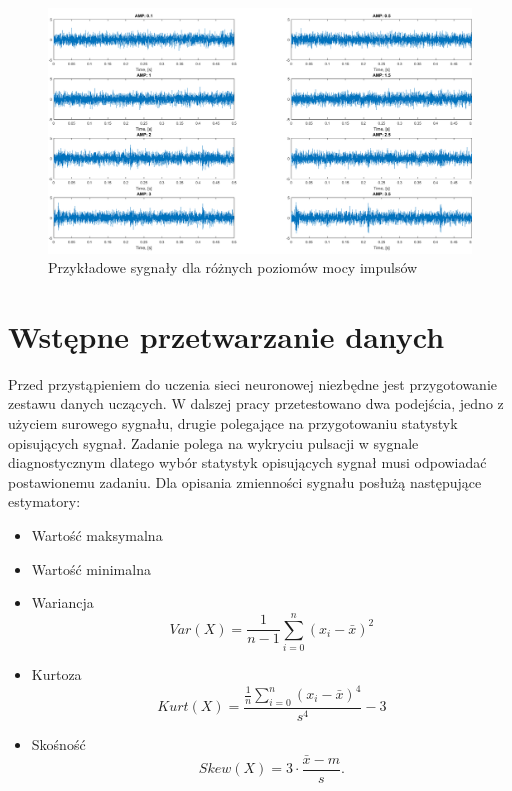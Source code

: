 \documentclass[inzynierska]{pwr_wmat_praca_dyplomowa}
\theoremstyle{plain}
\numberwithin{theorem}{chapter}
\theoremstyle{definition}
\numberwithin{theorem}{chapter}
\begin{document}
\begin{figure}[ht]
	\centering
	\includegraphics[width=16cm]{images/pulsacje.png}
	\caption{Przykładowe sygnały dla różnych poziomów mocy impulsów}
	\label{pulsacje}
\end{figure}
\section{Wstępne przetwarzanie danych}
Przed przystąpieniem do uczenia sieci neuronowej niezbędne jest przygotowanie zestawu danych uczących. W dalszej pracy przetestowano dwa podejścia, jedno z użyciem surowego sygnału, drugie polegające na przygotowaniu statystyk opisujących sygnał. Zadanie polega na wykryciu pulsacji w sygnale diagnostycznym dlatego wybór statystyk opisujących sygnał musi odpowiadać postawionemu zadaniu. Dla opisania zmienności sygnału posłużą następujące estymatory:
\begin{itemize}
	\item Wartość maksymalna
	\item Wartość minimalna
	\item Wariancja
	\begin{equation}
	Var (X) = \frac{1}{n-1} \sum_{i=0}^{n} \left(x_{i} - \bar{x}\right)^{2}
	\end{equation}
	\item Kurtoza
	\begin{equation}
	Kurt (X) = \frac{\frac{1}{n} \sum_{i=0}^{n}\left(x_{i} - \bar{x}\right)^{4}}{s^{4}} - 3
	\end{equation}
	\item Skośność
	\begin{equation}
	Skew (X) = 3 \cdot \frac{\bar{x} - m}{s}.
	\end{equation}
\end{itemize}
\end{document}
